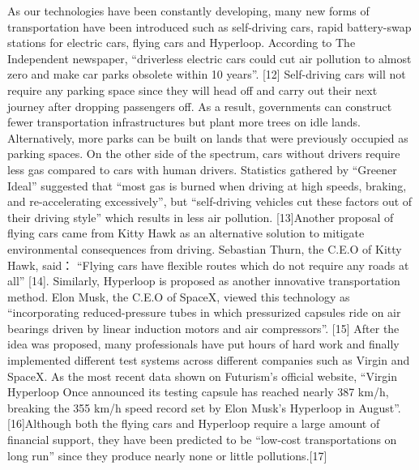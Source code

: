 \documentclass{mcmthesis}
\begin{document}
	\par
	As our technologies have been constantly developing, many new forms of transportation have been introduced such as self-driving cars, rapid battery-swap stations for electric cars, flying cars and Hyperloop. According to The Independent newspaper, “driverless electric cars could cut air pollution to almost zero and make car parks obsolete within 10 years”. [12] Self-driving cars will not require any parking space since they will head off and carry out their next journey after dropping passengers off. As a result, governments can construct fewer transportation infrastructures but plant more trees on idle lands. Alternatively, more parks can be built on lands that were previously occupied as parking spaces. On the other side of the spectrum, cars without drivers require less gas compared to cars with human drivers. Statistics gathered by “Greener Ideal” suggested that “most gas is burned when driving at high speeds, braking, and re-accelerating excessively”, but “self-driving vehicles cut these factors out of their driving style” which results in less air pollution. [13]Another proposal of flying cars came from Kitty Hawk as an alternative solution to mitigate environmental consequences from driving. Sebastian Thurn, the C.E.O of Kitty Hawk, said： “Flying cars have flexible routes which do not require any roads at all” [14]. Similarly, Hyperloop is proposed as another innovative transportation method. Elon Musk, the C.E.O of SpaceX, viewed this technology as “incorporating reduced-pressure tubes in which pressurized capsules ride on air bearings driven by linear induction motors and air compressors”. [15] After the idea was proposed, many professionals have put hours of hard work and finally implemented different test systems across different companies such as Virgin and SpaceX. As the most recent data shown on Futurism’s official website, “Virgin Hyperloop Once announced its testing capsule has reached nearly 387 km/h, breaking the 355 km/h speed record set by Elon Musk’s Hyperloop in August”. [16]Although both the flying cars and Hyperloop require a large amount of financial support, they have been predicted to be “low-cost transportations on long run” since they produce nearly none or little pollutions.[17]
	\par
\end{document}
